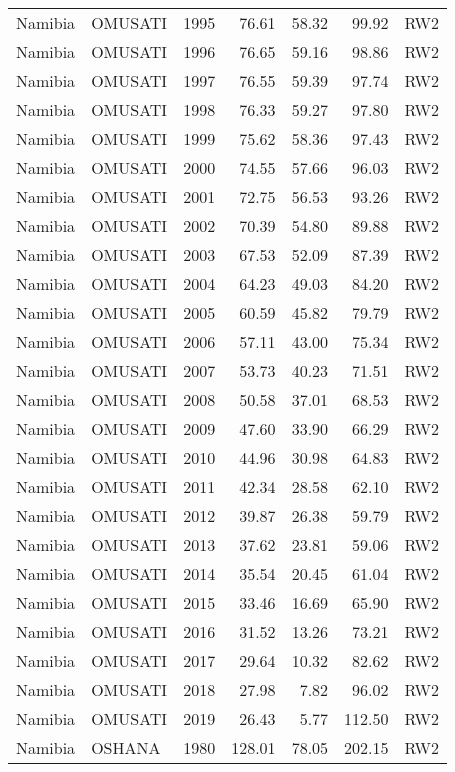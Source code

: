 \begin{longtable}{lllrrrl}
  Namibia & OMUSATI & 1995 & 76.61 & 58.32 & 99.92 & RW2 \\ 
  Namibia & OMUSATI & 1996 & 76.65 & 59.16 & 98.86 & RW2 \\ 
  Namibia & OMUSATI & 1997 & 76.55 & 59.39 & 97.74 & RW2 \\ 
  Namibia & OMUSATI & 1998 & 76.33 & 59.27 & 97.80 & RW2 \\ 
  Namibia & OMUSATI & 1999 & 75.62 & 58.36 & 97.43 & RW2 \\ 
  Namibia & OMUSATI & 2000 & 74.55 & 57.66 & 96.03 & RW2 \\ 
  Namibia & OMUSATI & 2001 & 72.75 & 56.53 & 93.26 & RW2 \\ 
  Namibia & OMUSATI & 2002 & 70.39 & 54.80 & 89.88 & RW2 \\ 
  Namibia & OMUSATI & 2003 & 67.53 & 52.09 & 87.39 & RW2 \\ 
  Namibia & OMUSATI & 2004 & 64.23 & 49.03 & 84.20 & RW2 \\ 
  Namibia & OMUSATI & 2005 & 60.59 & 45.82 & 79.79 & RW2 \\ 
  Namibia & OMUSATI & 2006 & 57.11 & 43.00 & 75.34 & RW2 \\ 
  Namibia & OMUSATI & 2007 & 53.73 & 40.23 & 71.51 & RW2 \\ 
  Namibia & OMUSATI & 2008 & 50.58 & 37.01 & 68.53 & RW2 \\ 
  Namibia & OMUSATI & 2009 & 47.60 & 33.90 & 66.29 & RW2 \\ 
  Namibia & OMUSATI & 2010 & 44.96 & 30.98 & 64.83 & RW2 \\ 
  Namibia & OMUSATI & 2011 & 42.34 & 28.58 & 62.10 & RW2 \\ 
  Namibia & OMUSATI & 2012 & 39.87 & 26.38 & 59.79 & RW2 \\ 
  Namibia & OMUSATI & 2013 & 37.62 & 23.81 & 59.06 & RW2 \\ 
  Namibia & OMUSATI & 2014 & 35.54 & 20.45 & 61.04 & RW2 \\ 
  Namibia & OMUSATI & 2015 & 33.46 & 16.69 & 65.90 & RW2 \\ 
  Namibia & OMUSATI & 2016 & 31.52 & 13.26 & 73.21 & RW2 \\ 
  Namibia & OMUSATI & 2017 & 29.64 & 10.32 & 82.62 & RW2 \\ 
  Namibia & OMUSATI & 2018 & 27.98 & 7.82 & 96.02 & RW2 \\ 
  Namibia & OMUSATI & 2019 & 26.43 & 5.77 & 112.50 & RW2 \\ 
  Namibia & OSHANA & 1980 & 128.01 & 78.05 & 202.15 & RW2 \\ 

\end{longtable}
